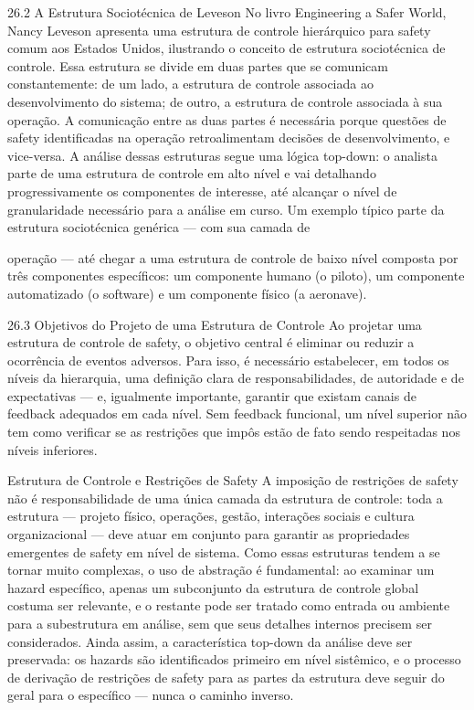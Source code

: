 26.2 A Estrutura Sociotécnica de Leveson No livro Engineering a Safer World, Nancy Leveson apresenta uma estrutura de controle hierárquico para safety comum aos Estados Unidos, ilustrando o conceito de estrutura sociotécnica de controle. Essa estrutura se divide em duas partes que se comunicam constantemente: de um lado, a estrutura de controle associada ao desenvolvimento do sistema; de outro, a estrutura de controle associada à sua operação. A comunicação entre as duas partes é necessária porque questões de safety identificadas na operação retroalimentam decisões de desenvolvimento, e vice-versa. A análise dessas estruturas segue uma lógica top-down: o analista parte de uma estrutura de controle em alto nível e vai detalhando progressivamente os componentes de interesse, até alcançar o nível de granularidade necessário para a análise em curso. Um exemplo típico parte da estrutura sociotécnica genérica — com sua camada de

operação — até chegar a uma estrutura de controle de baixo nível composta por três componentes específicos: um componente humano (o piloto), um componente automatizado (o software) e um componente físico (a aeronave).

26.3 Objetivos do Projeto de uma Estrutura de Controle Ao projetar uma estrutura de controle de safety, o objetivo central é eliminar ou reduzir a ocorrência de eventos adversos. Para isso, é necessário estabelecer, em todos os níveis da hierarquia, uma definição clara de responsabilidades, de autoridade e de expectativas — e, igualmente importante, garantir que existam canais de feedback adequados em cada nível. Sem feedback funcional, um nível superior não tem como verificar se as restrições que impôs estão de fato sendo respeitadas nos níveis inferiores.

Estrutura de Controle e Restrições de Safety A imposição de restrições de safety não é responsabilidade de uma única camada da estrutura de controle: toda a estrutura — projeto físico, operações, gestão, interações sociais e cultura organizacional — deve atuar em conjunto para garantir as propriedades emergentes de safety em nível de sistema. Como essas estruturas tendem a se tornar muito complexas, o uso de abstração é fundamental: ao examinar um hazard específico, apenas um subconjunto da estrutura de controle global costuma ser relevante, e o restante pode ser tratado como entrada ou ambiente para a subestrutura em análise, sem que seus detalhes internos precisem ser considerados. Ainda assim, a característica top-down da análise deve ser preservada: os hazards são identificados primeiro em nível sistêmico, e o processo de derivação de restrições de safety para as partes da estrutura deve seguir do geral para o específico — nunca o caminho inverso.

